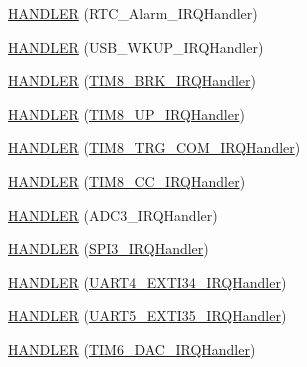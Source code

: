 \begin{DoxyCompactItemize}
\item 
\hyperlink{group___p_i_o_s_gae0731c6d70ba277057df059abde85816}{H\-A\-N\-D\-L\-E\-R} (R\-T\-C\-\_\-\-Alarm\-\_\-\-I\-R\-Q\-Handler)
\item 
\hyperlink{group___p_i_o_s_ga21643f12372d277da96ae9cf6318a197}{H\-A\-N\-D\-L\-E\-R} (U\-S\-B\-\_\-\-W\-K\-U\-P\-\_\-\-I\-R\-Q\-Handler)
\item 
\hyperlink{group___p_i_o_s_ga73f3c95c6f0c9f0e20976cbfc6107445}{H\-A\-N\-D\-L\-E\-R} (\hyperlink{group___p_i_o_s___t_i_m_gaa2754c1d099a614d954b4b449fd5ea19}{T\-I\-M8\-\_\-\-B\-R\-K\-\_\-\-I\-R\-Q\-Handler})
\item 
\hyperlink{group___p_i_o_s_ga61af3452715de85c1208b7dc0f371c7c}{H\-A\-N\-D\-L\-E\-R} (\hyperlink{group___p_i_o_s___t_i_m_ga255e5267ee3275b665940ed1a61ae3ce}{T\-I\-M8\-\_\-\-U\-P\-\_\-\-I\-R\-Q\-Handler})
\item 
\hyperlink{group___p_i_o_s_ga3df951db7fa4ae71db65090983cb1947}{H\-A\-N\-D\-L\-E\-R} (\hyperlink{group___p_i_o_s___t_i_m_ga5e1addc9f7d3e0ffa4ed6ca284123043}{T\-I\-M8\-\_\-\-T\-R\-G\-\_\-\-C\-O\-M\-\_\-\-I\-R\-Q\-Handler})
\item 
\hyperlink{group___p_i_o_s_ga015d5c07ddbb9c51c66a77065a08c22a}{H\-A\-N\-D\-L\-E\-R} (\hyperlink{group___p_i_o_s___t_i_m_ga96e44d6fe80524f038da6254514316a4}{T\-I\-M8\-\_\-\-C\-C\-\_\-\-I\-R\-Q\-Handler})
\item 
\hyperlink{group___p_i_o_s_ga446e8dca18881d21381741e57a0e2853}{H\-A\-N\-D\-L\-E\-R} (A\-D\-C3\-\_\-\-I\-R\-Q\-Handler)
\item 
\hyperlink{group___p_i_o_s_ga8adae9815b64a37af214413ac6c1843a}{H\-A\-N\-D\-L\-E\-R} (\hyperlink{group___tau_labs_core_ga82987561e28d02b184ecb0515a5e5d2b}{S\-P\-I3\-\_\-\-I\-R\-Q\-Handler})
\item 
\hyperlink{group___p_i_o_s_ga5015849ca8d806a1625b3584cb5c962d}{H\-A\-N\-D\-L\-E\-R} (\hyperlink{group___p_i_o_s___u_s_a_r_t_ga552c5d505ae108eef11cd39ebc22773b}{U\-A\-R\-T4\-\_\-\-E\-X\-T\-I34\-\_\-\-I\-R\-Q\-Handler})
\item 
\hyperlink{group___p_i_o_s_ga40bf19e8e0d8608164a79fc0c9697b9f}{H\-A\-N\-D\-L\-E\-R} (\hyperlink{group___p_i_o_s___u_s_a_r_t_ga379570b068a7a67525c68b24831f77fd}{U\-A\-R\-T5\-\_\-\-E\-X\-T\-I35\-\_\-\-I\-R\-Q\-Handler})
\item 
\hyperlink{group___p_i_o_s_ga7b3222d00864779c700492060cc4dda9}{H\-A\-N\-D\-L\-E\-R} (\hyperlink{group___p_i_o_s___t_i_m_ga0839a45f331c4c067939b9c4533bbf4d}{T\-I\-M6\-\_\-\-D\-A\-C\-\_\-\-I\-R\-Q\-Handler})
\item 

\end{DoxyCompactItemize}
